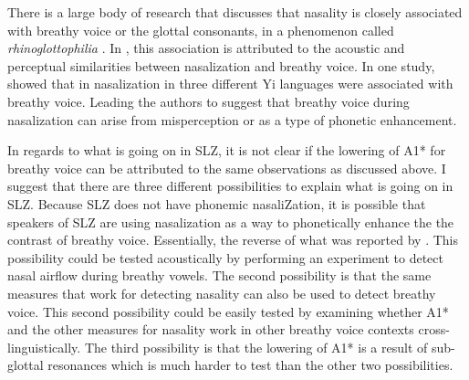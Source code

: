 There is a large body of research that discusses that nasality is closely associated with breathy voice or the glottal consonants, in a phenomenon called \textit{rhinoglottophilia} \citep{matisoffRhinoglottophiliaMysteriousConnection1975,ohalaPhoneticExplanationsNasal1975,ohalaPhoneticsNasalPhonology1993,bennettMayanPhonology2016}. In \citet{blevinsEvolutionPonapeicNasal1993,matisoffRhinoglottophiliaMysteriousConnection1975}, this association is attributed to the acoustic and perceptual similarities between nasalization and breathy voice. In one study, \citet{garellekBreathyVoiceNasality2016} showed that in nasalization in three different Yi languages were associated with breathy voice. Leading the authors to suggest that breathy voice during nasalization can arise from misperception or as a type of phonetic enhancement. 

In regards to what is going on in SLZ, it is not clear if the lowering of A1* for breathy voice can be attributed to the same observations as discussed above. I suggest that there are three different possibilities to explain what is going on in SLZ. Because SLZ does not have phonemic nasaliZation, it is possible that speakers of SLZ are using nasalization as a way to phonetically enhance the the contrast of breathy voice. Essentially, the reverse of what was reported by \citet{garellekBreathyVoiceNasality2016}. This possibility could be tested acoustically by performing an experiment to detect nasal airflow during breathy vowels. The second possibility is that the same measures that work for detecting nasality can also be used to detect breathy voice. This second possibility could be easily tested by examining whether A1* and the other measures for nasality work in other breathy voice contexts cross-linguistically. The third possibility is that the lowering of A1* is a result of sub-glottal resonances which is much harder to test than the other two possibilities. 

